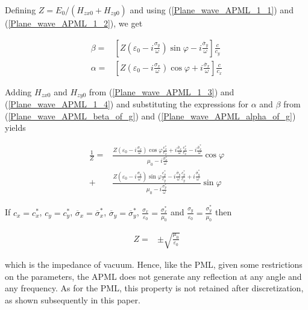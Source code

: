 Defining $Z=E_{0}/\left( H_{zx0}+H_{zy0}\right)$ and using (\ref{Plane_wave_APML_1_1})
and (\ref{Plane_wave_APML_1_2}), we get

\begin{eqnarray}
\beta  = & \left[ Z\left( \varepsilon _{0}-i\frac{\sigma _{y}}{\omega }\right) \sin \varphi -i\frac{\overline{\sigma }_{y}}{\omega }\right] \frac{c}{c_{y}}\label{Plane_wave_APML_beta_of_g} \\
\alpha  = & \left[ Z\left( \varepsilon _{0}-i\frac{\sigma _{x}}{\omega }\right) \cos \varphi +i\frac{\overline{\sigma }_{x}}{\omega }\right] \frac{c}{c_{x}}\label{Plane_wave_APML_alpha_of_g} 
\end{eqnarray}


Adding $H_{zx0}$ and $H_{zy0}$ from (\ref{Plane_wave_APML_1_3})
and (\ref{Plane_wave_APML_1_4}) and substituting the expressions
for $\alpha$ and $\beta$ from (\ref{Plane_wave_APML_beta_of_g})
and (\ref{Plane_wave_APML_alpha_of_g}) yields

\begin{eqnarray}
\frac{1}{Z} = & \frac{Z\left( \varepsilon _{0}-i\frac{\sigma _{x}}{\omega }\right) \cos \varphi \frac{c^{*}_{x}}{c_{x}}+i\frac{\overline{\sigma }_{x}}{\omega }\frac{c^{*}_{x}}{c_{x}}-i\frac{\overline{\sigma }^{*}_{x}}{\omega }}{\mu _{0}-i\frac{\sigma ^{*}_{x}}{\omega }}\cos \varphi \nonumber \\
 + & \frac{Z\left( \varepsilon _{0}-i\frac{\sigma _{y}}{\omega }\right) \sin \varphi \frac{c^{*}_{y}}{c_{y}}-i\frac{\overline{\sigma }_{y}}{\omega }\frac{c^{*}_{y}}{c_{y}}+i\frac{\overline{\sigma }^{*}_{y}}{\omega }}{\mu _{0}-i\frac{\sigma ^{*}_{y}}{\omega }}\sin \varphi 
\end{eqnarray}


If $c_{x}=c^{*}_{x}$, $c_{y}=c^{*}_{y}$, $\overline{\sigma }_{x}=\overline{\sigma }^{*}_{x}$, $\overline{\sigma }_{y}=\overline{\sigma }^{*}_{y}$, $\frac{\sigma _{x}}{\varepsilon _{0}}=\frac{\sigma ^{*}_{x}}{\mu _{0}}$ and $\frac{\sigma _{y}}{\varepsilon _{0}}=\frac{\sigma ^{*}_{y}}{\mu _{0}}$ then

\begin{eqnarray}
Z = & \pm \sqrt{\frac{\mu _{0}}{\varepsilon _{0}}}\label{APML_impedance} 
\end{eqnarray}


which is the impedance of vacuum. Hence, like the PML, given some
restrictions on the parameters, the APML does not generate any reflection
at any angle and any frequency. As for the PML, this property is not
retained after discretization, as shown subsequently in this paper.

